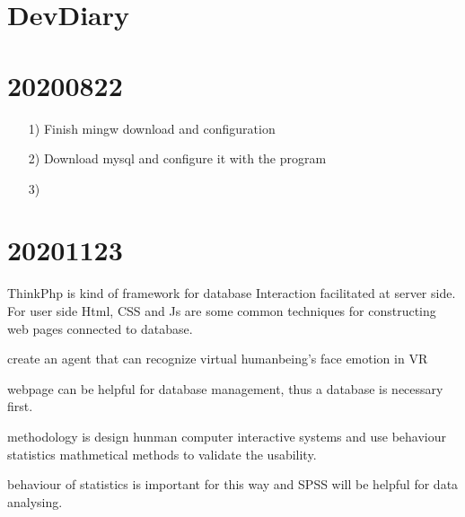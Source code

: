 \documentclass{article}
\begin{document}
\section{DevDiary}
\section{20200822}
\begin{enumerate}
    \item[1)] 
    Finish mingw download and configuration
    \item[2)] 
    Download mysql and configure it with the program
    \item[3)] 
     
\end{enumerate}
\section{20201123}
ThinkPhp is kind of framework for database Interaction facilitated at server side. For user side Html, CSS and Js are some common techniques for constructing web pages connected to database.

create an agent that can recognize virtual humanbeing's face emotion in VR

webpage can be helpful for database management, thus a database is necessary first.

methodology is design hunman computer interactive systems and use behaviour statistics mathmetical methods to validate the usability.

behaviour of statistics is important for this way and SPSS will be helpful for data analysing.




\end{document}
